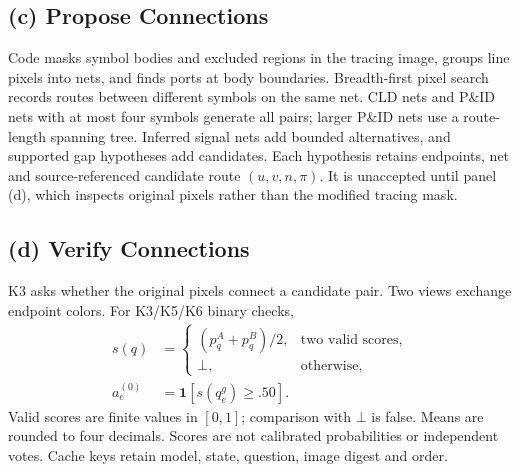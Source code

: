 \documentclass[sigconf,review]{acmart}
\begin{document}
\subsection{(c) Propose Connections}
\label{sec:pairs}
Code masks symbol bodies and excluded regions in the tracing image, groups line pixels into nets, and finds ports at body boundaries. Breadth-first pixel search records routes between different symbols on the same net. CLD nets and P\&ID nets with at most four symbols generate all pairs; larger P\&ID nets use a route-length spanning tree. Inferred signal nets add bounded alternatives, and supported gap hypotheses add candidates. Each hypothesis retains endpoints, net and source-referenced candidate route $(u,v,n,\pi)$. It is unaccepted until panel (d), which inspects original pixels rather than the modified tracing mask.

\subsection{(d) Verify Connections}
\label{sec:verify}
K3 asks whether the original pixels connect a candidate pair. Two views exchange endpoint colors. For K3/K5/K6 binary checks,
\begin{equation}
 \begin{aligned}
 s(q)&=\begin{cases}(p_q^A+p_q^B)/2,&\text{two valid scores},\\
 \bot,&\text{otherwise},\end{cases}\\
 a_e^{(0)}&=\mathbf1[s(q_e^g)\ge .50].
 \end{aligned}
 \label{eq:global}
\end{equation}
Valid scores are finite values in $[0,1]$; comparison with $\bot$ is false. Means are rounded to four decimals. Scores are not calibrated probabilities or independent votes. Cache keys retain model, state, question, image digest and order.
\end{document}
